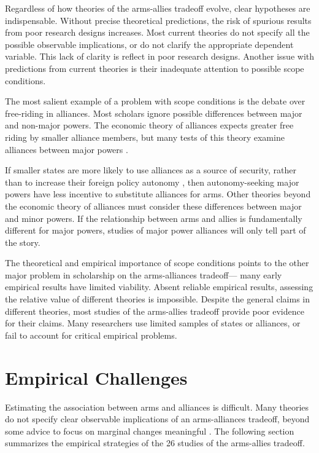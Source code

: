 \documentclass[12pt]{article}
\begin{document}
Regardless of how theories of the arms-allies tradeoff evolve, clear hypotheses are indispensable. Without precise theoretical predictions, the risk of spurious results from poor research designs increases. Most current theories do not specify all the possible observable implications, or do not clarify the appropriate dependent variable. This lack of clarity is reflect in poor research designs. Another issue with predictions from current theories is their inadequate attention to possible scope conditions. 

The most salient example of a problem with scope conditions is the debate over free-riding in alliances. Most scholars ignore possible differences between major and non-major powers. The economic theory of alliances expects greater free riding by smaller alliance members, but many tests of this theory examine alliances between major powers \citep{Thies1987, ConybeareSandler1990, Siroky2012}. 

If smaller states are more likely to use alliances as a source of security, rather than to increase their foreign policy autonomy \citep{Morrow1991}, then autonomy-seeking major powers have less incentive to substitute alliances for arms. Other theories beyond the economic theory of alliances must consider these differences between major and minor powers. If the relationship between arms and allies is fundamentally different for major powers, studies of major power alliances will only tell part of the story.  


The theoretical and empirical importance of scope conditions points to the other major problem in scholarship on the arms-alliances tradeoff--- many early empirical results have limited viability. Absent reliable empirical results, assessing the relative value of different theories is impossible. Despite the general claims in different theories, most studies of the arms-allies tradeoff provide poor evidence for their claims. Many researchers use limited samples of states or alliances, or fail to account for critical empirical problems.   


\section*{Empirical Challenges}

Estimating the association between arms and alliances is difficult. Many theories do not specify clear observable implications of an arms-alliances tradeoff, beyond some advice to focus on marginal changes meaningful \citep{Morrow2000, Starr2000}. The following section summarizes the empirical strategies of the 26 studies of the arms-allies tradeoff.
\end{document}
